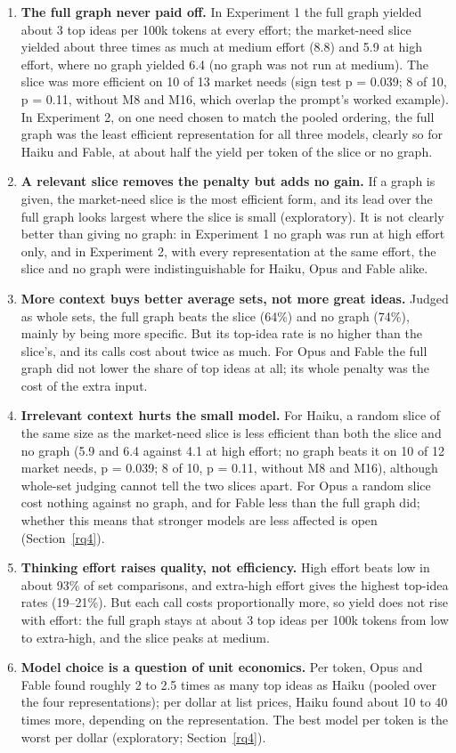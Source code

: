 \begin{enumerate}
\def\labelenumi{\arabic{enumi}.}
\item
  \textbf{The full graph never paid off.} In Experiment 1 the full graph yielded about 3 top ideas per 100k tokens at every effort; the market-need slice yielded about three times as much at medium effort (8.8) and 5.9 at high effort, where no graph yielded 6.4 (no graph was not run at medium). The slice was more efficient on 10 of 13 market needs (sign test p = 0.039; 8 of 10, p = 0.11, without M8 and M16, which overlap the prompt's worked example). In Experiment 2, on one need chosen to match the pooled ordering, the full graph was the least efficient representation for all three models, clearly so for Haiku and Fable, at about half the yield per token of the slice or no graph.
\item
  \textbf{A relevant slice removes the penalty but adds no gain.} If a graph is given, the market-need slice is the most efficient form, and its lead over the full graph looks largest where the slice is small (exploratory). It is not clearly better than giving no graph: in Experiment 1 no graph was run at high effort only, and in Experiment 2, with every representation at the same effort, the slice and no graph were indistinguishable for Haiku, Opus and Fable alike.
\item
  \textbf{More context buys better average sets, not more great ideas.} Judged as whole sets, the full graph beats the slice (64\%) and no graph (74\%), mainly by being more specific. But its top-idea rate is no higher than the slice's, and its calls cost about twice as much. For Opus and Fable the full graph did not lower the share of top ideas at all; its whole penalty was the cost of the extra input.
\item
  \textbf{Irrelevant context hurts the small model.} For Haiku, a random slice of the same size as the market-need slice is less efficient than both the slice and no graph (5.9 and 6.4 against 4.1 at high effort; no graph beats it on 10 of 12 market needs, p = 0.039; 8 of 10, p = 0.11, without M8 and M16), although whole-set judging cannot tell the two slices apart. For Opus a random slice cost nothing against no graph, and for Fable less than the full graph did; whether this means that stronger models are less affected is open (Section~\ref{rq4}).
\item
  \textbf{Thinking effort raises quality, not efficiency.} High effort beats low in about 93\% of set comparisons, and extra-high effort gives the highest top-idea rates (19--21\%). But each call costs proportionally more, so yield does not rise with effort: the full graph stays at about 3 top ideas per 100k tokens from low to extra-high, and the slice peaks at medium.
\item
  \textbf{Model choice is a question of unit economics.} Per token, Opus and Fable found roughly 2 to 2.5 times as many top ideas as Haiku (pooled over the four representations); per dollar at list prices, Haiku found about 10 to 40 times more, depending on the representation. The best model per token is the worst per dollar (exploratory; Section~\ref{rq4}).
\end{enumerate}


